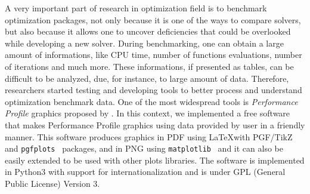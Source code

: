 A very important part of research in optimization field is to benchmark
optimization packages, not only because it is one of the ways to compare
solvers, but also because it allows one to uncover deficiencies that could
be overlooked while developing a new solver. During benchmarking, one can
obtain a large amount of  informations, like CPU time, number of functions
evaluations, number of iterations and much more. These informations, if
presented as tables, can be difficult to be analyzed, due, for instance, to
large amount of data.  Therefore, researchers started testing and developing
tools to better process and understand optimization benchmark data. One of
the most widespread tools is \emph{Performance Profile} graphics proposed by
\textcite{Dolan:2002du}. In this context, we implemented a free software
that makes Performance Profile graphics using data provided by user in a
friendly manner. This software produces graphics in PDF using \LaTeX with
PGF/TikZ~\cite{TikZ} and \texttt{pgfplots}~\cite{pgfplots} packages, and in
PNG using \texttt{matplotlib}~\cite{Hunter:2007} and it can also be easily
extended to be used with other plots libraries. The software is implemented
in Python3 with support for internationalization and is under GPL (General
Public License) Version 3.
